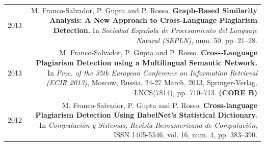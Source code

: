 \documentclass[10pt]{article}
\begin{document}
\begin{tabular}{L!{\VRule}R}
	2013&M. Franco-Salvador, P. Gupta and P. Rosso. \textbf{Graph-Based Similarity Analysis: A New Approach to Cross-Language Plagiarism Detection.}
	In \emph{Sociedad Espa{\~n}ola de Procesamiento del Languaje Natural (SEPLN)}, num. 50, pp. 21--28. \vspace{5pt}\\
	2013&M. Franco-Salvador, P. Gupta and P. Rosso. \textbf{Cross-Language Plagiarism Detection using a Multilingual Semantic Network.}
	In \emph{Proc. of the 35th European Conference on Information Retrieval (ECIR 2013)}, Moscow, Russia, 24-27 March, 2013, Springer-Verlag, LNCS(7814), pp. 710--713. \textbf{(CORE B)}\vspace{5pt}\\
	2012&M. Franco-Salvador, P. Gupta and P. Rosso. \textbf{Cross-language Plagiarism Detection Using BabelNet's Statistical Dictionary.}
	In \emph{Computaci{\'o}n y Sistemas, Revista Iberoamericana de Computaci{\'o}n}, ISSN 1405-5546, vol. 16, num. 4, pp. 383--390.\vspace{5pt}\\
\end{tabular}
\end{document}

